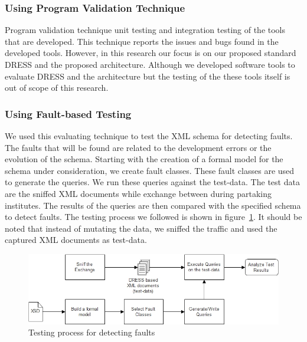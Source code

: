 \documentclass[12pt,a4paper,oneside]{book}
\begin{document}
		
		\subsubsection{Using Program Validation Technique}
		Program validation technique unit testing and integration testing of the tools that are developed. This technique reports the issues and bugs found in the developed tools. However, in this research our focus is on our proposed standard DRESS and the proposed architecture. Although we developed software tools to evaluate DRESS and the architecture but the testing of the these tools itself is out of scope of this research. 
		
		\subsubsection{Using Fault-based Testing}
		We used this evaluating technique to test the XML schema for detecting faults. The faults that will be found are related to the development errors or the evolution of the schema\cite{Testing XML Schemas}. Starting with the creation of a formal model for the schema under consideration, we create fault classes. These fault classes are used to generate the queries. We run these queries against the test-data. The test data are the sniffed XML documents while exchange between during partaking institutes. The results of the queries are then compared with the specified schema to detect faults. The testing process we followed is shown in figure~\ref{fig:fault-based-testing}. It should be noted that instead of mutating the data, we sniffed the traffic and used the captured XML documents as test-data.  		
		
\begin{figure}[!htp]
  \centering
  \includegraphics[width=13.5cm]{fault-based-testing.jpg}
  \caption{Testing process for detecting faults}
  \label{fig:fault-based-testing}
\end{figure}
\end{document}
